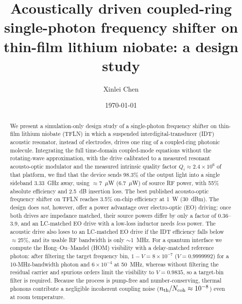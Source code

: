 \documentclass[aps,prapplied,reprint,superscriptaddress,amsmath,amssymb,floatfix]{revtex4-2}
\begin{document}
\title{Acoustically driven coupled-ring single-photon frequency shifter on thin-film lithium niobate: a design study}

\author{Xinlei Chen}

\date{\today}

\begin{abstract}
We present a simulation-only design study of a single-photon frequency shifter on thin-film lithium niobate (TFLN) in which a suspended interdigital-transducer (IDT) acoustic resonator, instead of electrodes, drives one ring of a coupled-ring photonic molecule. Integrating the full time-domain coupled-mode equations without the rotating-wave approximation, with the drive calibrated to a measured resonant acousto-optic modulator and the measured intrinsic quality factor $Q_i\approx2.4\times10^6$ of that platform, we find that the device sends 98.3\% of the output light into a single sideband 3.33~GHz away, using $\approx$7~$\mu$W (6.7~$\mu$W) of source RF power, with 55\% absolute efficiency and 2.5~dB insertion loss. The best published acousto-optic frequency shifter on TFLN reaches 3.5\% on-chip efficiency at 1~W (30~dBm). The design does \emph{not}, however, offer a power advantage over electro-optic (EO) driving: once both drives are impedance matched, their source powers differ by only a factor of 0.36--3.9, and an LC-matched EO drive with a low-loss inductor needs \emph{less} power. The acoustic drive also loses to an LC-matched EO drive if the IDT efficiency falls below $\approx$25\%, and its usable RF bandwidth is only $\sim$1~MHz. For a quantum interface we compute the Hong--Ou--Mandel (HOM) visibility with a delay-matched reference photon: after filtering the target frequency bin, $1-V=8\times10^{-7}$ ($V=0.9999992$) for a 10-MHz-bandwidth photon and $6\times10^{-4}$ at 50~MHz, whereas without filtering the residual carrier and spurious orders limit the visibility to $V=0.9835$, so a target-bin filter is required. Because the process is pump-free and number-conserving, thermal phonons contribute a negligible incoherent coupling noise ($n_{\rm th}/N_{\rm coh}\approx10^{-8}$) even at room temperature.
\end{abstract}

\maketitle
\end{document}
